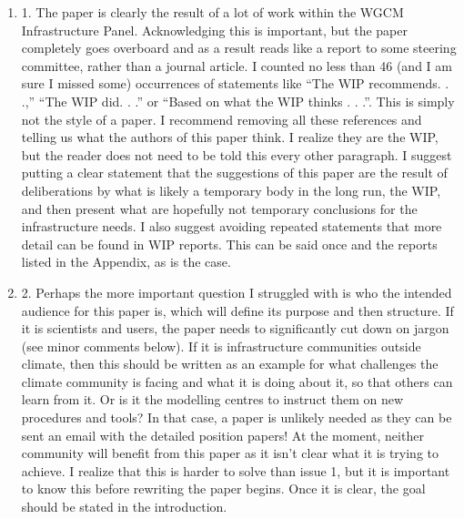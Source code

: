 \documentclass[gmd,manuscript]{copernicus}
\begin{document}
\begin{enumerate}[label=RC3-\arabic*,leftmargin=*]
\item 1. The paper is clearly the result of a lot of work within the
  WGCM Infrastructure Panel. Acknowledging this is important, but the
  paper completely goes overboard and as a result reads like a report
  to some steering committee, rather than a journal article. I counted
  no less than 46 (and I am sure I missed some) occurrences of
  statements like “The WIP recommends. . .,” “The WIP did. . .” or
  “Based on what the WIP thinks . . .”. This is simply not the style
  of a paper. I recommend removing all these references and telling us
  what the authors of this paper think. I realize they are the WIP,
  but the reader does not need to be told this every other paragraph.
  I suggest putting a clear statement that the suggestions of this
  paper are the result of deliberations by what is likely a temporary
  body in the long run, the WIP, and then present what are hopefully
  not temporary conclusions for the infrastructure needs. I also
  suggest avoiding repeated statements that more detail can be found
  in WIP reports. This can be said once and the reports listed in the
  Appendix, as is the case.
\item 2. Perhaps the more important question I struggled with is who the
  intended audience for this paper is, which will define its purpose
  and then structure. If it is scientists and users, the paper needs
  to significantly cut down on jargon (see minor comments below). If
  it is infrastructure communities outside climate, then this should
  be written as an example for what challenges the climate community
  is facing and what it is doing about it, so that others can learn
  from it. Or is it the modelling centres to instruct them on new
  procedures and tools? In that case, a paper is unlikely needed as
  they can be sent an email with the detailed position papers! At the
  moment, neither community will benefit from this paper as it isn’t
  clear what it is trying to achieve. I realize that this is harder to
  solve than issue 1, but it is important to know this before
  rewriting the paper begins. Once it is clear, the goal should be
  stated in the introduction.


\end{enumerate}
\end{document}
